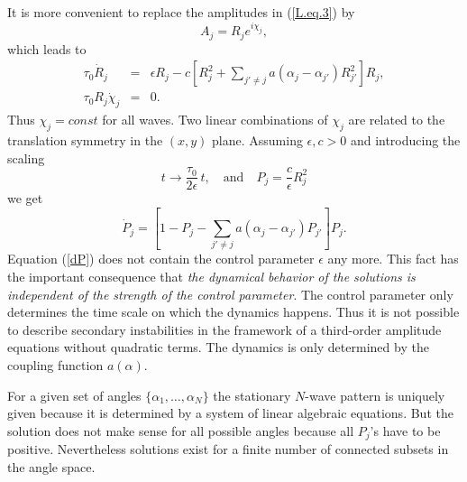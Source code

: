 It is more convenient to replace the amplitudes in (\ref{L.eq.3}) by
\begin{equation}
  A_j=R_je^{i\chi_j},
  \label{ARX}
\end{equation}
which leads to
\begin{eqnarray}
  \tau_0\dot{R}_j&=&\epsilon R_j-c\left[R_j^2+\sum\limits_{j'\not=j}
   a(\alpha_j-\alpha_{j'})R_{j'}^2\right]R_j,\label{dR}\\
  \tau_0R_j\dot{\chi}_j&=&0.
  \label{dChi}
\end{eqnarray}
Thus $\chi_j=const$ for all waves. Two linear combinations of
$\chi_j$ are related to the translation symmetry in the $(x,y)$ plane.
Assuming $\epsilon,c>0$ and introducing the scaling
\begin{equation}
  t\to\frac{\tau_0}{2\epsilon}\,t,\quad\mbox{and}\quad
   P_j=\frac{c}{\epsilon}R_j^2
  \label{b0.scale}
\end{equation}
we get 
\begin{equation}
  \dot{P}_j=\left[1-P_j-\sum\limits_{j'\not=j}a(\alpha_j-\alpha_{j'})
   P_{j'}\right]P_j.
  \label{dP}
\end{equation}
Equation (\ref{dP}) does not contain the
control parameter $\epsilon$ any more. This fact has the important
consequence that {\em the dynamical behavior of the solutions is
independent of the strength of the control parameter\/}. The control
parameter only determines the time scale on which the dynamics
happens. Thus it is not possible to describe secondary instabilities
in the framework of a third-order amplitude equations without
quadratic terms. The dynamics is only determined by the coupling
function $a(\alpha)$.

For a given set of angles $\{\alpha_1,\ldots,\alpha_N\}$ the 
stationary $N$-wave pattern is uniquely given because it is
determined by a system of linear algebraic equations. But the
solution does not make sense for all possible angles because all
$P_j$'s have to be positive.  Nevertheless solutions exist for a
finite number of connected subsets in the angle space.

